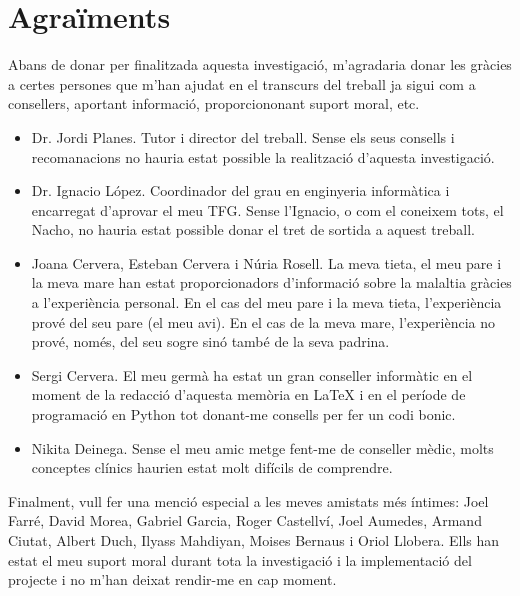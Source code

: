 \documentclass[a4paper,12pt]{report}
\begin{document}
\chapter*{Agraïments}
Abans de donar per finalitzada aquesta investigació, m'agradaria donar les gràcies a certes persones que m'han ajudat en el transcurs del treball ja sigui com a consellers, aportant informació, proporciononant suport moral, etc.
\begin{itemize}
    \item Dr. Jordi Planes. Tutor i director del treball. Sense els seus consells i recomanacions no hauria estat possible la realització d'aquesta investigació.
    \item  Dr. Ignacio López. Coordinador del grau en enginyeria informàtica i encarregat d'aprovar el meu TFG. Sense l'Ignacio, o com el coneixem tots, el Nacho, no hauria estat possible donar el tret de sortida a aquest treball.
    \item Joana Cervera, Esteban Cervera i Núria Rosell. La meva tieta, el meu pare i la meva mare han estat proporcionadors d'informació sobre la malaltia gràcies a l'experiència personal. En el cas del meu pare i la meva tieta, l'experiència prové del seu pare (el meu avi). En el cas de la meva mare, l'experiència no prové, només, del seu sogre sinó també de la seva padrina.
    \item Sergi Cervera. El meu germà ha estat un gran conseller informàtic en el moment de la redacció d'aquesta memòria en LaTeX i en el període de programació en Python tot donant-me consells per fer un codi bonic.
    \item Nikita Deinega. Sense el meu amic metge fent-me de conseller mèdic, molts conceptes clínics haurien estat molt difícils de comprendre.
\end{itemize}
Finalment, vull fer una menció especial a les meves amistats més íntimes: Joel Farré, David Morea, Gabriel Garcia, Roger Castellví, Joel Aumedes, Armand Ciutat, Albert Duch, Ilyass Mahdiyan, Moises Bernaus i Oriol Llobera. Ells han estat el meu suport moral durant tota la investigació i la implementació del projecte i no m'han deixat rendir-me en cap moment.
\end{document}
